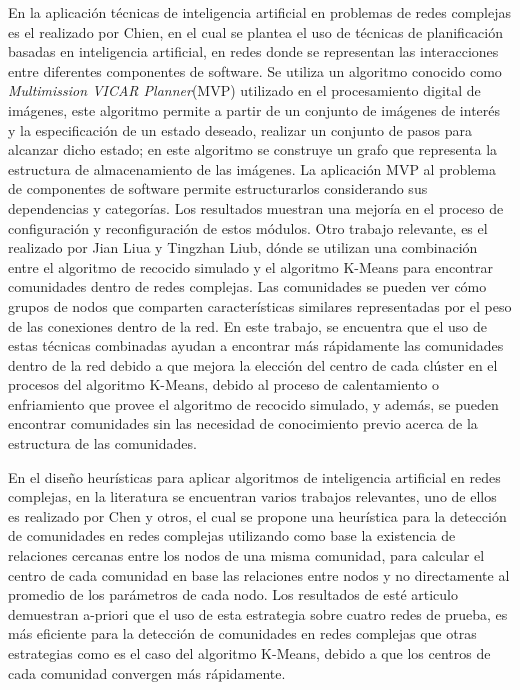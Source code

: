 En la aplicación técnicas de inteligencia artificial en problemas de redes complejas es el realizado por Chien\cite{Chien1998}, en el cual se plantea el uso de técnicas de planificación basadas en inteligencia
artificial, en redes donde se representan las interacciones entre diferentes componentes de software. Se utiliza un algoritmo conocido como \textit{Multimission VICAR Planner}(MVP) utilizado en el procesamiento digital de imágenes, este algoritmo permite a partir de un conjunto
de imágenes de interés y la especificación de un estado deseado, realizar un conjunto de pasos para alcanzar dicho estado; en este algoritmo se construye un grafo que representa la estructura de almacenamiento de las imágenes. La aplicación MVP al problema de componentes de software permite estructurarlos considerando sus dependencias
y categorías. Los resultados muestran una mejoría en el proceso de configuración y reconfiguración de estos módulos. Otro trabajo relevante, es el realizado por Jian Liua y Tingzhan Liub\cite{Liu2010}, dónde se utilizan una combinación entre el algoritmo de recocido simulado y el algoritmo K-Means para encontrar comunidades dentro de redes complejas. Las comunidades se pueden ver cómo grupos de nodos que comparten características similares representadas por el peso de las conexiones dentro de la
red. En este trabajo, se encuentra que el uso de estas técnicas combinadas ayudan a encontrar más rápidamente las comunidades dentro de la red debido a que mejora la elección del centro de cada clúster en el procesos del algoritmo K-Means, debido al proceso de calentamiento o enfriamiento que provee el algoritmo de recocido simulado, y además, se pueden encontrar comunidades sin las necesidad de conocimiento previo acerca de la estructura de las comunidades.

En el diseño heurísticas para aplicar algoritmos de inteligencia artificial en redes complejas, en la literatura se encuentran varios trabajos relevantes, uno de ellos es realizado por Chen y otros\cite{Chen2009}, el cual se propone una heurística para la detección de comunidades en redes complejas utilizando como base la existencia de relaciones cercanas entre los nodos de una misma comunidad, para calcular el centro de cada comunidad en base las relaciones entre nodos y no directamente al promedio de los parámetros de cada nodo. Los resultados de esté articulo demuestran a-priori que el uso de esta estrategia sobre cuatro redes de prueba, es más eficiente para la detección de comunidades en redes complejas que otras estrategias como es el caso del algoritmo K-Means, debido a que los centros de cada comunidad convergen más rápidamente.